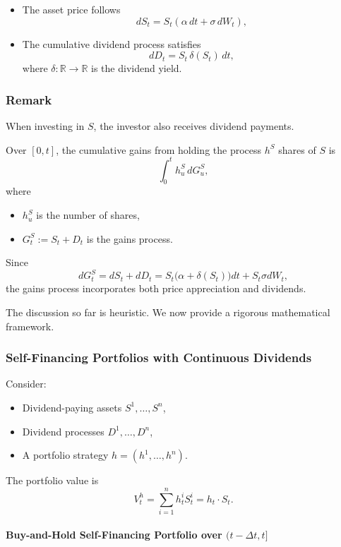 \documentclass[12pt,a4paper]{article}
\theoremstyle{definition}
\newcommand{\R}{\mathbb{R}}
\begin{document}
\begin{itemize}
\item The asset price follows
\[
dS_t = S_t(\alpha\,dt + \sigma\, dW_t),
\]
\item The cumulative dividend process satisfies
\[
dD_t = S_t\,\delta(S_t)\, dt,
\]
where $\delta:\R\to\R$ is the dividend yield.
\end{itemize}

\subsubsection{Remark}

When investing in $S$, the investor also receives dividend payments.

Over $[0,t]$, the cumulative gains from holding the process $h^S$ shares of $S$ is
\[
\int_0^t h_u^S\, dG_u^S,
\]
where
\begin{itemize}
\item $h_u^S$ is the number of shares,
\item $G_t^S := S_t + D_t$ is the gains process.
\end{itemize}

Since
\[
dG_t^S = dS_t + dD_t = S_t\big(\alpha + \delta(S_t)\big)dt + S_t \sigma dW_t,
\]
the gains process incorporates both price appreciation and dividends.

The discussion so far is heuristic. We now provide a rigorous mathematical framework.

\subsubsection{Self-Financing Portfolios with Continuous Dividends}

Consider:
\begin{itemize}
\item Dividend-paying assets $S^1,\dots,S^n$,
\item Dividend processes $D^1,\dots,D^n$,
\item A portfolio strategy $h = (h^1,\dots,h^n)$.
\end{itemize}

The portfolio value is
\[
V_t^h = \sum_{i=1}^n h_t^i S_t^i = h_t \cdot S_t.
\]

\paragraph{Buy-and-Hold Self-Financing Portfolio over $(t-\Delta t, t]$}
\end{document}
